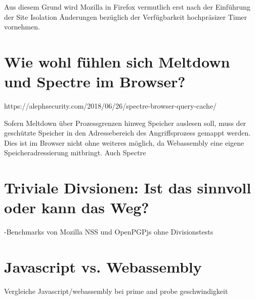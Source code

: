 Aus diesem Grund wird Mozilla in Firefox vermutlich erst nach der Einführung der Site Isolation Änderungen bezüglich der Verfügbarkeit hochpräsizer Timer vornehmen.

\section{Wie wohl fühlen sich Meltdown und Spectre im Browser?}
\label{MeltdownSpectreBrowser}

https://alephsecurity.com/2018/06/26/spectre-browser-query-cache/
\cite{OvercomingSpectreBrowserMitigations}

Sofern Meltdown über Prozessgrenzen hinweg Speicher auslesen soll, muss der geschützte Speicher in den Adressebereich des Angriffsprozess gemappt werden.
Dies ist im Browser nicht ohne weiteres möglich, da Webassembly eine eigene Speicheradressierung mitbringt.
Auch Spectre

\section{Triviale Divsionen: Ist das sinnvoll oder kann das Weg?}

-Benchmarks von Mozilla NSS und OpenPGPjs ohne Divisionstests

\section{Javascript vs. Webassembly}

Vergleiche Javascript/webassembly bei prime and probe geschwindigkeit